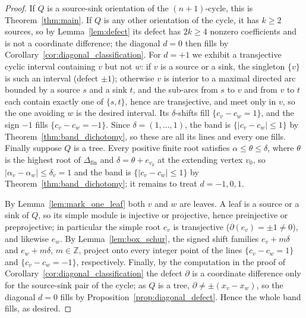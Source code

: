 \documentclass[11pt, a4paper]{amsart}
\theoremstyle{definition}
\newcommand{\ZZ}{\mathbb{Z}}
\begin{document}
\begin{proof}
If $Q$ is a source-sink orientation of the $(n+1)$-cycle, this is
Theorem~\ref{thm:main}. If $Q$ is any other orientation of the cycle, it has
$k \geq 2$ sources, so by Lemma~\ref{lem:defect} its defect has $2k \geq 4$
nonzero coefficients and is not a coordinate difference; the diagonal $d = 0$
then fills by Corollary~\ref{cor:diagonal_classification}. For $d = +1$ we
exhibit a transjective cyclic interval containing $v$ but not $w$: if $v$ is a
source or a sink, the singleton $\{v\}$ is such an interval
\textup{(}defect $\pm 1$\textup{)}; otherwise $v$ is interior to a maximal
directed arc bounded by a source $s$ and a sink $t$, and the sub-arcs from $s$
to $v$ and from $v$ to $t$ each contain exactly one of $\{s, t\}$, hence are
transjective, and meet only in $v$, so the one avoiding $w$ is the desired
interval. Its $\delta$-shifts fill $\{c_v - c_w = 1\}$, and the sign $-1$
fills $\{c_v - c_w = -1\}$. Since $\delta = (1, \dots, 1)$, the band is
$\{|c_v - c_w| \leq 1\}$ by Theorem~\ref{thm:band_dichotomy}, so these are all
its lines and every one fills. Finally suppose $Q$ is a tree. Every
positive finite root satisfies $\alpha \leq \theta \leq \delta$, where
$\theta$ is the highest root of $\Delta_{\mathrm{fin}}$ and $\delta =
\theta + e_{v_0}$ at the extending vertex $v_0$, so $|\alpha_v -
\alpha_w| \leq \delta_v = 1$ and the band is $\{|c_v - c_w| \leq 1\}$ by
Theorem~\ref{thm:band_dichotomy}; it remains to treat $d = -1, 0, 1$.

By Lemma~\ref{lem:mark_one_leaf} both $v$ and $w$ are leaves. A leaf is a
source or a sink of $Q$, so its simple module is injective or projective,
hence preinjective or preprojective; in particular the simple root $e_v$ is
transjective \textup{(}$\partial(e_v) = \pm 1 \neq 0$\textup{)}, and likewise
$e_w$. By Lemma~\ref{lem:box_schur}, the signed shift families
$e_v + m\delta$ and $e_w + m\delta$, $m \in \ZZ$, project onto every
integer point of the lines $\{c_v-c_w=1\}$ and
$\{c_v-c_w=-1\}$, respectively. Finally, by the computation in the proof of
Corollary~\ref{cor:diagonal_classification} the defect $\partial$ is a
coordinate difference only for the source-sink pair of the cycle; as $Q$ is a
tree, $\partial \neq \pm(x_v - x_w)$, so the diagonal $d = 0$ fills by
Proposition~\ref{prop:diagonal_defect}. Hence the whole band fills, as
desired.
\end{proof}
\end{document}
